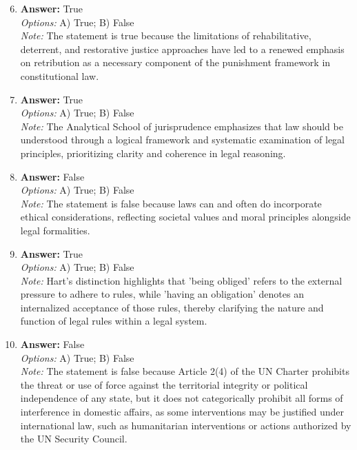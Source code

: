 \documentclass[12pt]{article}
\begin{document}
\begin{enumerate}[label=\arabic*.]
\setcounter{enumi}{5}
\item \textbf{Answer:} True
\\ \textit{Options:} A) True; B) False
\\ \textit{Note:} The statement is true because the limitations of rehabilitative, deterrent, and restorative justice approaches have led to a renewed emphasis on retribution as a necessary component of the punishment framework in constitutional law.
\item \textbf{Answer:} True
\\ \textit{Options:} A) True; B) False
\\ \textit{Note:} The Analytical School of jurisprudence emphasizes that law should be understood through a logical framework and systematic examination of legal principles, prioritizing clarity and coherence in legal reasoning.
\item \textbf{Answer:} False
\\ \textit{Options:} A) True; B) False
\\ \textit{Note:} The statement is false because laws can and often do incorporate ethical considerations, reflecting societal values and moral principles alongside legal formalities.
\item \textbf{Answer:} True
\\ \textit{Options:} A) True; B) False
\\ \textit{Note:} Hart's distinction highlights that 'being obliged' refers to the external pressure to adhere to rules, while 'having an obligation' denotes an internalized acceptance of those rules, thereby clarifying the nature and function of legal rules within a legal system.
\item \textbf{Answer:} False
\\ \textit{Options:} A) True; B) False
\\ \textit{Note:} The statement is false because Article 2(4) of the UN Charter prohibits the threat or use of force against the territorial integrity or political independence of any state, but it does not categorically prohibit all forms of interference in domestic affairs, as some interventions may be justified under international law, such as humanitarian interventions or actions authorized by the UN Security Council.
\end{enumerate}
\end{document}
